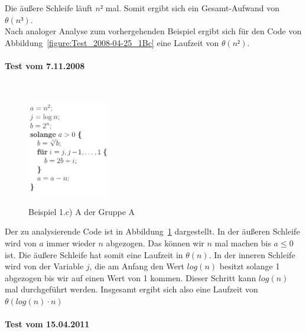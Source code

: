 \documentclass[a4paper, 12pt]{article}
\begin{document}
Die äußere Schleife läuft $n²$ mal. Somit ergibt sich ein Gesamt-Aufwand von
$θ\left(n³\right)$.\\

Nach analoger Analyse zum vorhergehenden Beispiel ergibt sich für den Code von
Abbildung~\ref{figure:Test_2008-04-25_1Bc} eine Laufzeit von
$θ\left(n²\right)$.

\paragraph{Test vom 7.11.2008}~\\

\begin{figure}[htbp]
	\caption{Beispiel 1.c) A der Gruppe A}
	\vskip 0.2cm
	\centering
	\includegraphics[width=0.32\textwidth]{Figures/Test_2008-11-07_1AcA}
	\label{figure:Test_2008-11-07_1AcA}
\end{figure}

Der zu analysierende Code ist in Abbildung~\ref{figure:Test_2008-11-07_1AcA}
dargestellt. In der äußeren Schleife wird von $a$ immer wieder $n$ abgezogen.
Das können wir $n$ mal machen bis $a≤0$ ist. Die äußere Schleife hat somit
eine Laufzeit in $θ\left(n\right)$. In der inneren Schleife wird von der
Variable $j$, die am Anfang den Wert $log\left(n\right)$ besitzt solange 1
abgezogen bis wir auf einen Wert von 1 kommen. Dieser Schritt kann
$log\left(n\right)$ mal durchgeführt werden. Insgesamt ergibt sich also eine
Laufzeit von $θ\left(log\left(n\right)⋅ n\right)$

\paragraph{Test vom 15.04.2011}~\\
\end{document}

